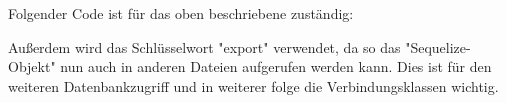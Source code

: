 Folgender Code ist für das oben beschriebene zuständig:


Außerdem wird das Schlüsselwort "export" verwendet, da so das "Sequelize-Objekt" nun auch in anderen Dateien aufgerufen werden kann. Dies ist für den weiteren Datenbankzugriff und in weiterer folge die Verbindungsklassen wichtig.



